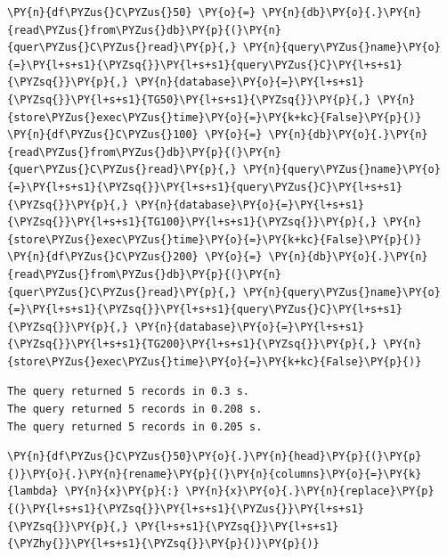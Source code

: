     \begin{tcolorbox}[breakable, size=fbox, boxrule=1pt, pad at break*=1mm,colback=cellbackground, colframe=cellborder]
\begin{Verbatim}[commandchars=\\\{\}]
\PY{n}{df\PYZus{}C\PYZus{}50} \PY{o}{=} \PY{n}{db}\PY{o}{.}\PY{n}{read\PYZus{}from\PYZus{}db}\PY{p}{(}\PY{n}{quer\PYZus{}C\PYZus{}read}\PY{p}{,} \PY{n}{query\PYZus{}name}\PY{o}{=}\PY{l+s+s1}{\PYZsq{}}\PY{l+s+s1}{query\PYZus{}C}\PY{l+s+s1}{\PYZsq{}}\PY{p}{,} \PY{n}{database}\PY{o}{=}\PY{l+s+s1}{\PYZsq{}}\PY{l+s+s1}{TG50}\PY{l+s+s1}{\PYZsq{}}\PY{p}{,} \PY{n}{store\PYZus{}exec\PYZus{}time}\PY{o}{=}\PY{k+kc}{False}\PY{p}{)}
\PY{n}{df\PYZus{}C\PYZus{}100} \PY{o}{=} \PY{n}{db}\PY{o}{.}\PY{n}{read\PYZus{}from\PYZus{}db}\PY{p}{(}\PY{n}{quer\PYZus{}C\PYZus{}read}\PY{p}{,} \PY{n}{query\PYZus{}name}\PY{o}{=}\PY{l+s+s1}{\PYZsq{}}\PY{l+s+s1}{query\PYZus{}C}\PY{l+s+s1}{\PYZsq{}}\PY{p}{,} \PY{n}{database}\PY{o}{=}\PY{l+s+s1}{\PYZsq{}}\PY{l+s+s1}{TG100}\PY{l+s+s1}{\PYZsq{}}\PY{p}{,} \PY{n}{store\PYZus{}exec\PYZus{}time}\PY{o}{=}\PY{k+kc}{False}\PY{p}{)}
\PY{n}{df\PYZus{}C\PYZus{}200} \PY{o}{=} \PY{n}{db}\PY{o}{.}\PY{n}{read\PYZus{}from\PYZus{}db}\PY{p}{(}\PY{n}{quer\PYZus{}C\PYZus{}read}\PY{p}{,} \PY{n}{query\PYZus{}name}\PY{o}{=}\PY{l+s+s1}{\PYZsq{}}\PY{l+s+s1}{query\PYZus{}C}\PY{l+s+s1}{\PYZsq{}}\PY{p}{,} \PY{n}{database}\PY{o}{=}\PY{l+s+s1}{\PYZsq{}}\PY{l+s+s1}{TG200}\PY{l+s+s1}{\PYZsq{}}\PY{p}{,} \PY{n}{store\PYZus{}exec\PYZus{}time}\PY{o}{=}\PY{k+kc}{False}\PY{p}{)}
\end{Verbatim}
\end{tcolorbox}

    \begin{Verbatim}[commandchars=\\\{\}]
The query returned 5 records in 0.3 s.
The query returned 5 records in 0.208 s.
The query returned 5 records in 0.205 s.
    \end{Verbatim}

    \begin{tcolorbox}[breakable, size=fbox, boxrule=1pt, pad at break*=1mm,colback=cellbackground, colframe=cellborder]
\begin{Verbatim}[commandchars=\\\{\}]
\PY{n}{df\PYZus{}C\PYZus{}50}\PY{o}{.}\PY{n}{head}\PY{p}{(}\PY{p}{)}\PY{o}{.}\PY{n}{rename}\PY{p}{(}\PY{n}{columns}\PY{o}{=}\PY{k}{lambda} \PY{n}{x}\PY{p}{:} \PY{n}{x}\PY{o}{.}\PY{n}{replace}\PY{p}{(}\PY{l+s+s1}{\PYZsq{}}\PY{l+s+s1}{\PYZus{}}\PY{l+s+s1}{\PYZsq{}}\PY{p}{,} \PY{l+s+s1}{\PYZsq{}}\PY{l+s+s1}{\PYZhy{}}\PY{l+s+s1}{\PYZsq{}}\PY{p}{)}\PY{p}{)}
\end{Verbatim}
\end{tcolorbox}
 
